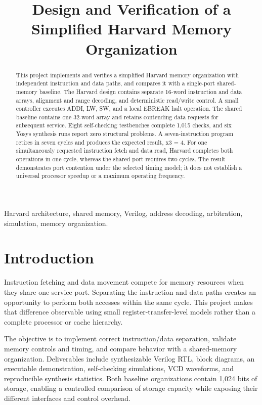 \documentclass[conference,letterpaper]{IEEEtran}
\title{Design and Verification of a Simplified Harvard Memory Organization}
\author{\IEEEauthorblockN{Yogesh Mishra (2401010518), Shagun Singh (2401010434)}
\IEEEauthorblockN{Pratyaksha Shastri (2401010348), Shiva Sharma (2401010441)}
\IEEEauthorblockN{Saksham Miglani (2401010401)}}
\begin{document}
\maketitle

\begin{abstract}
This project implements and verifies a simplified Harvard memory organization with independent instruction and data paths, and compares it with a single-port shared-memory baseline. The Harvard design contains separate 16-word instruction and data arrays, alignment and range decoding, and deterministic read/write control. A small controller executes ADDI, LW, SW, and a local EBREAK halt operation. The shared baseline contains one 32-word array and retains contending data requests for subsequent service. Eight self-checking testbenches complete 1,015 checks, and six Yosys synthesis runs report zero structural problems. A seven-instruction program retires in seven cycles and produces the expected result, x3 = 4. For one simultaneously requested instruction fetch and data read, Harvard completes both operations in one cycle, whereas the shared port requires two cycles. The result demonstrates port contention under the selected timing model; it does not establish a universal processor speedup or a maximum operating frequency.
\end{abstract}

\begin{IEEEkeywords}
Harvard architecture, shared memory, Verilog, address decoding, arbitration, simulation, memory organization.
\end{IEEEkeywords}

\section{Introduction}

Instruction fetching and data movement compete for memory resources when they share one service port. Separating the instruction and data paths creates an opportunity to perform both accesses within the same cycle. This project makes that difference observable using small register-transfer-level models rather than a complete processor or cache hierarchy.

The objective is to implement correct instruction/data separation, validate memory controls and timing, and compare behavior with a shared-memory organization. Deliverables include synthesizable Verilog RTL, block diagrams, an executable demonstration, self-checking simulations, VCD waveforms, and reproducible synthesis statistics. Both baseline organizations contain 1,024 bits of storage, enabling a controlled comparison of storage capacity while exposing their different interfaces and control overhead.
\end{document}
